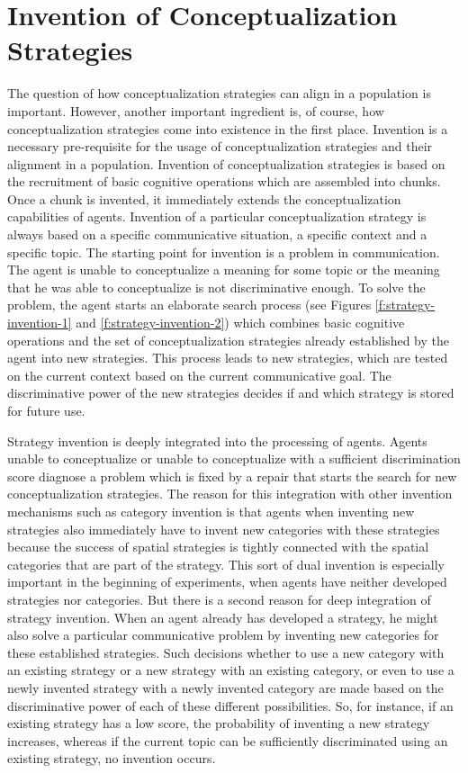 \section{Invention of Conceptualization Strategies}
The question of how conceptualization strategies can align in a population is important.
However, another important ingredient is, of course, how conceptualization strategies come
into existence in the first place. Invention is a necessary pre-requisite for the usage of
conceptualization strategies and their alignment in a population. 
Invention of conceptualization strategies is based on the recruitment of basic cognitive operations
which are assembled into chunks. Once a chunk is invented, it immediately extends the conceptualization capabilities of agents. 
Invention of a particular conceptualization strategy is always 
based on a specific communicative situation, a specific context and a specific topic. 
The starting point for invention is a problem in communication. The agent is unable to conceptualize a 
meaning for some topic or the meaning that he was able to conceptualize is not discriminative enough. 
To solve the problem, the agent starts an elaborate search process (see Figures \ref{f:strategy-invention-1}
and \ref{f:strategy-invention-2})
which combines basic cognitive operations and the set of conceptualization 
strategies already established by the agent into new strategies. This process 
leads to new strategies, which are tested on the current context based on the
current communicative goal. The discriminative power of the new strategies decides if and
which strategy is stored for future use.

Strategy invention is deeply integrated into the processing of agents. 
Agents unable to conceptualize or unable to conceptualize with a sufficient discrimination
score diagnose a problem which is fixed by a repair that starts the search for new
conceptualization strategies.  The reason for this integration
with other invention mechanisms such as category invention is 
that agents when inventing new strategies also immediately have to invent new categories with
these strategies because the success of spatial strategies is tightly connected with the
spatial categories that are part of the strategy. This sort of dual invention 
is especially important in the beginning of experiments, when agents have neither developed 
strategies nor categories. But there is a second reason for deep integration of strategy invention. 
When an agent already has developed a strategy, he might also solve a particular
communicative problem by inventing new categories for these established strategies. 
Such decisions whether to use a new category
with an existing strategy or a new strategy with an existing category, or even to use
a newly invented strategy with a newly invented category are made based on the discriminative
power of each of these different possibilities. So, for instance, if an existing strategy has a low score,
the probability of inventing a new strategy increases, whereas if the current topic 
can be sufficiently discriminated using an existing strategy, no invention occurs.


